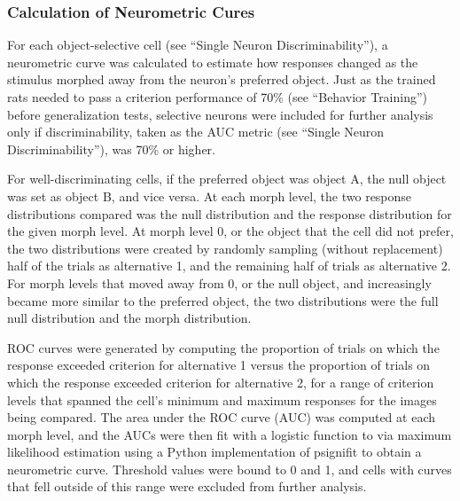 \subsubsection{Calculation of Neurometric Cures}
For each object-selective cell (see ``Single Neuron Discriminability''), a neurometric curve was calculated to estimate how responses changed as the stimulus morphed away from the neuron's preferred object. Just as the trained rats needed to pass a criterion performance of 70\% (see ``Behavior Training'') before generalization tests, selective neurons were included for further analysis only if discriminability, taken as the AUC metric (see ``Single Neuron Discriminability''), was 70\% or higher.

For well-discriminating cells, if the preferred object was object A, the null object was set as object B, and vice versa. At each morph level, the two response distributions compared was the null distribution and the response distribution for the given morph level. At morph level 0, or the object that the cell did not prefer, the two distributions were created by randomly sampling (without replacement) half of the trials as alternative 1, and the remaining half of trials as alternative 2. For morph levels that moved away from 0, or the null object, and increasingly became more similar to the preferred object, the two distributions were the full null distribution and the morph distribution. 

ROC curves were generated by computing the proportion of trials on which the response exceeded criterion for alternative 1 versus the proportion of trials on which the response exceeded criterion for alternative 2, for a range of criterion levels that spanned the cell's minimum and maximum responses for the images being compared. The area under the ROC curve (AUC) was computed at each morph level, and the AUCs were then fit with a logistic function to via  maximum likelihood estimation\cite{Virtanen2020} using a Python implementation of psignifit\cite{Schutt2016, Wichmann2001a} to obtain a neurometric curve. Threshold values were bound to 0 and 1, and cells with curves that fell outside of this range were excluded from further analysis. 

